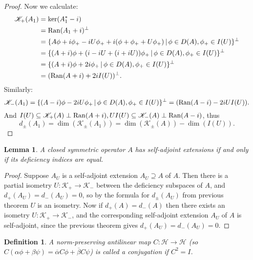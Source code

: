 \documentclass[12pt,oneside]{report}
\newtheorem{lem}[thm]{Lemma}
\newtheorem{defn}[thm]{Definition}
\begin{document}
\begin{proof}
    Now we calculate: \begin{align*}
        \mathscr{K}_{+}(A_{1}) &= \ker(A_{1}^{*} - i)  \\
        &= \mathrm{Ran}(A_{1} + i)^{\perp}  \\
        &= \{ A\phi + i\phi_{+} - iU\phi_{+} + i(\phi + \phi_{+} + U\phi_{+}) \, | \, \phi \in D(A), \phi_{+} \in I(U) \}^{\perp}  \\
        &= \{ (A + i)\phi + (i - iU + (i + iU))\phi_{+} \, | \, \phi \in D(A), \phi_{+} \in I(U) \}^{\perp} \\
        &= \{ (A + i)\phi + 2i\phi_{+} \, | \, \phi \in D(A), \phi_{+} \in I(U) \}^{\perp} \\
        &= (\mathrm{Ran}(A+i) + 2iI(U))^{\perp}.
    \end{align*}
Similarly: $$\mathscr{K}_{-}(A_{1}) = \{ (A - i)\phi - 2iU\phi_{+} \, | \, \phi \in D(A), \phi_{+} \in I(U) \}^{\perp} = (\mathrm{Ran}(A - i) - 2iUI(U)).$$ And $I(U) \subseteq \mathscr{K}_{+}(A) \perp \mathrm{Ran}(A+i), UI(U) \subseteq \mathscr{K}_{-}(A) \perp \mathrm{Ran}(A - i)$, thus $$d_{\pm}(A_{1}) = \dim(\mathscr{K}_{\pm}(A_{1})) = \dim(\mathscr{K}_{\pm}(A)) - \dim(I(U)).$$
\end{proof}

\begin{lem}
    A closed symmetric operator $A$ has self-adjoint extensions if and only if its deficiency indices are equal.
\end{lem}
\begin{proof}
    Suppose $A_{U}$ is a self-adjoint extension $A_{U} \supseteq A$ of $A$. Then there is a partial isometry $U: \mathscr{K}_{+} \to \mathscr{K}_{-}$ between the deficiency subspaces of $A$, and $d_{+}(A_{U}) = d_{-}(A_{U}) = 0$, so by the formula for $d_{\pm}(A_{U})$ from previous theorem $U$ is an isometry. Now if $d_{+}(A) = d_{-}(A)$ then there exists an isometry $U: \mathscr{K}_{+} \to \mathscr{K}_{-}$, and the corresponding self-adjoint extension $A_{U}$ of $A$ is self-adjoint, since the previous theorem gives $d_{+}(A_{U}) = d_{-}(A_{U}) = 0$.
\end{proof}

\begin{defn}
    A norm-preserving antilinear map $C: \mathscr{H} \to \mathscr{H}$ (so $C(\alpha \phi + \beta \psi) = \overline{\alpha}C\phi + \overline{\beta}C\psi$) is called a conjugation if $C^{2} = I$.
\end{defn}
\end{document}
